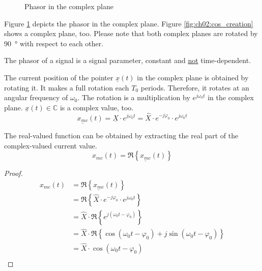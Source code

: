 \begin{refsection}
\begin{figure}[H]
	\caption{Phasor in the complex plane}
	\label{fig:ch02:cmplxplane_phasor}
\end{figure}

Figure \ref{fig:ch02:cmplxplane_phasor} depicts the phasor in the complex plane. Figure \ref{fig:ch02:cos_creation} shows a complex plane, too. Please note that both complex planes are rotated by \SI{90}{\degree} with respect to each other.

\begin{fact}
	The phasor of a signal is a signal parameter, constant and \underline{not} time-dependent.
\end{fact}

The current position of the pointer $\underline{x}(t)$ in the complex plane is obtained by rotating it. It makes a full rotation each $T_0$ periods. Therefore, it rotates at an angular frequency of $\omega_0$. The rotation is a multiplication by $e^{j \omega_0 t}$ in the complex plane. $\underline{x}(t) \in \mathbb{C}$ is a complex value, too.
\begin{equation}
	\underline{x_{mc}}(t) = \underline{X} \cdot e^{j \omega_0 t} = \hat{X} \cdot e^{-j \varphi_0} \cdot e^{j \omega_0 t}
\end{equation}

The real-valued function can be obtained by extracting the real part of the complex-valued current value.
\begin{equation}
	x_{mc}(t) = \Re\left\{\underline{x_{mc}}(t)\right\}
\end{equation}

\begin{proof}{}
	\begin{equation}
		\begin{split}
			x_{mc}(t) &= \Re\left\{\underline{x_{mc}}(t)\right\} \\
			 &= \Re\left\{\hat{X} \cdot e^{-j \varphi_0} \cdot e^{j \omega_0 t}\right\} \\
			 &= \hat{X} \cdot \Re\left\{e^{j \left(\omega_0 t - \varphi_0\right)}\right\} \\
			 &= \hat{X} \cdot \Re\left\{\cos \left(\omega_0 t - \varphi_0\right) + j \sin \left(\omega_0 t - \varphi_0\right)\right\} \\
			 &= \hat{X} \cdot \cos \left(\omega_0 t - \varphi_0\right) \\
		\end{split}
	\end{equation}
\end{proof}


\end{refsection}
